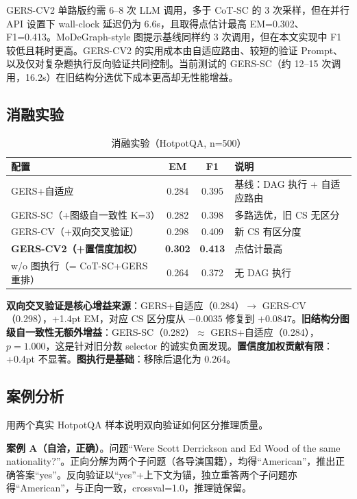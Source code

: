 \documentclass[11pt,a4paper]{ctexart}
\begin{document}
GERS-CV2 单路版约需 6--8 次 LLM 调用，多于 CoT-SC 的 3 次采样，但在并行 API 设置下 wall-clock 延迟仍为 6.6s，且取得点估计最高 EM=0.302、F1=0.413。MoDeGraph-style 图提示基线同样约 3 次调用，但在本文实现中 F1 较低且耗时更高。GERS-CV2 的实用成本由自适应路由、较短的验证 Prompt、以及仅对复杂题执行反向验证共同控制。当前测试的 GERS-SC（约 12--15 次调用，16.2s）在旧结构分选优下成本更高却无性能增益。

\subsection{消融实验}

\begin{table}[h]
\centering
\caption{消融实验（HotpotQA, n=500）}
\begin{tabular}{lccl}
\toprule
配置 & EM & F1 & 说明 \\
\midrule
GERS+自适应 & 0.284 & 0.395 & 基线：DAG 执行 + 自适应路由 \\
GERS-SC（+图级自一致性 K=3） & 0.282 & 0.398 & 多路选优，旧 CS 无区分 \\
GERS-CV（+双向交叉验证） & 0.298 & 0.409 & 新 CS 有区分度 \\
\textbf{GERS-CV2（+置信度加权）} & \textbf{0.302} & \textbf{0.413} & 点估计最高 \\
w/o 图执行（= CoT-SC+GERS 重排） & 0.264 & 0.372 & 无 DAG 执行 \\
\bottomrule
\end{tabular}
\end{table}

\textbf{双向交叉验证是核心增益来源}：GERS+自适应（0.284）$\to$ GERS-CV（0.298），+1.4pt EM，对应 CS 区分度从 $-0.0035$ 修复到 $+0.0847$。\textbf{旧结构分图级自一致性无额外增益}：GERS-SC（0.282）$\approx$ GERS+自适应（0.284），$p=1.000$，这是针对旧分数 selector 的诚实负面发现。\textbf{置信度加权贡献有限}：+0.4pt 不显著。\textbf{图执行是基础}：移除后退化为 0.264。

\subsection{案例分析}

用两个真实 HotpotQA 样本说明双向验证如何区分推理质量。

\textbf{案例 A（自洽，正确）}。问题``Were Scott Derrickson and Ed Wood of the same nationality?''。正向分解为两个子问题（各导演国籍），均得``American''，推出正确答案``yes''。反向验证以``yes''+上下文为锚，独立重答两个子问题亦得``American''，与正向一致，crossval=1.0，推理链保留。
\end{document}
